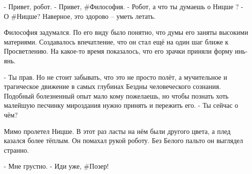 - Привет, робот.
- Привет, #Философия.
- Робот, а что ты думаешь о Ницше ?
- О #Ницше? Наверное, это здорово – уметь летать.

Философия задумался. По его виду было понятно, что думы его заняты высокими материями. Создавалось впечатление, что он стал ещё на один шаг ближе к Просветлению. На какое-то время показалось, что его зрачки приняли форму инь-янь.

- Ты прав. Но не стоит забывать, что это не просто полёт, а мучительное и трагическое движение в самых глубинах Бездны человеческого сознания. Подобный болезненный опыт мало кому пожелаешь, но чтобы познать хоть малейшую песчинку мироздания нужно принять и пережить его.
- Ты сейчас о чём?

Мимо пролетел Ницше. В этот раз ласты на нём были другого цвета, а плед казался более тёплым. Он помахал рукой роботу. Без Белого пальто он выглядел странно.

- Мне грустно.
- Иди уже, #Позер!